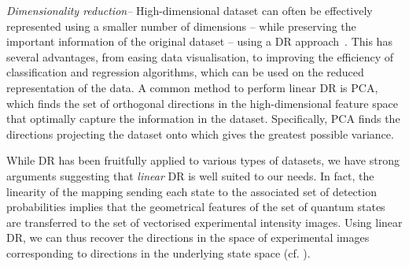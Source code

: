 \textit{Dimensionality reduction--} High-dimensional dataset can often be effectively represented using a smaller number of dimensions -- while preserving the important information of the original dataset -- using a DR approach~\cite{cunningham2008dimension,fodor2002survey}. This has several advantages, from easing data visualisation, to improving the efficiency of classification and regression algorithms, which can be used on the reduced representation of the data. %
A common method to perform linear DR is \ac{PCA}, which finds the set of orthogonal directions in the high-dimensional feature space that optimally capture the information in the dataset. Specifically, \ac{PCA} finds the directions projecting the dataset onto which gives the greatest possible variance.

While DR has been fruitfully applied to various types of datasets, we have strong arguments suggesting that \emph{linear} DR is well suited to our needs.
In fact, the linearity of the mapping sending each state to the associated set of detection probabilities implies that the geometrical features of the set of quantum states are transferred to the set of vectorised experimental intensity images. Using {linear} DR, we can thus recover the directions in the space of experimental images corresponding to directions in the underlying state space (cf. \cite{SI}).

